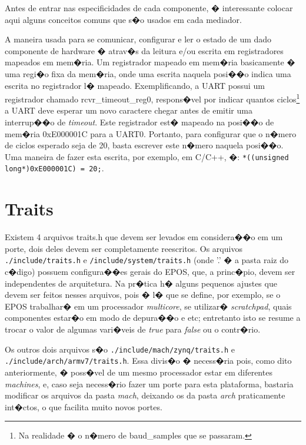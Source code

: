 \documentclass{ufscThesis/ufscThesis} %
\begin{document}
Antes de entrar nas especificidades de cada componente, � interessante colocar aqui alguns conceitos comuns que s�o usados em cada mediador.

A maneira usada para se comunicar, configurar e ler o estado de um dado componente de hardware � atrav�s da leitura e/ou escrita em registradores mapeados em mem�ria. Um registrador mapeado em mem�ria basicamente � uma regi�o fixa da mem�ria, onde uma escrita naquela posi��o indica uma escrita no registrador l� mapeado.
Exemplificando, a UART possui um registrador chamado rcvr\_timeout\_reg0, respons�vel por indicar quantos ciclos\footnote{Na realidade � o n�mero de baud\_samples que se passaram.} a UART deve esperar um novo caractere chegar antes de emitir uma interrup��o de \emph{timeout}. Este registrador est� mapeado na posi��o de mem�ria 0xE000001C para a UART0. Portanto, para configurar que o n�mero de ciclos esperado seja de 20, basta escrever este n�mero naquela posi��o. Uma maneira de fazer esta escrita, por exemplo, em C/C++, �: \verb+*((unsigned long*)0xE000001C) = 20;+.



\section{Traits}

Existem 4 arquivos traits.h que devem ser levados em considera��o em um porte, dois deles devem ser completamente reescritos. Os arquivos \verb+./include/traits.h+ e \verb+/include/system/traits.h+ (onde '.' � a pasta raiz do c�digo) possuem configura��es gerais do EPOS, que, a princ�pio, devem ser independentes de arquitetura. Na pr�tica h� alguns pequenos ajustes que devem ser feitos nesses arquivos, pois � l� que se define, por exemplo, se o EPOS trabalhar� em um processador \emph{multicore}, se utilizar� \emph{scratchpad}, quais componentes estar�o em modo de depura��o e etc; entretanto isto se resume a trocar o valor de algumas vari�veis de \emph{true} para \emph{false} ou o contr�rio.

Os outros dois arquivos s�o \verb+./include/mach/zynq/traits.h+ e \verb+./include/arch/armv7/traits.h+. Essa divis�o � necess�ria pois, como dito anteriormente, � poss�vel de um mesmo processador estar em diferentes \emph{machines}, e, caso seja necess�rio fazer um porte para esta plataforma, bastaria modificar os arquivos da pasta \emph{mach}, deixando os da pasta \emph{arch} praticamente int�ctos, o que facilita muito novos portes.
\end{document}
